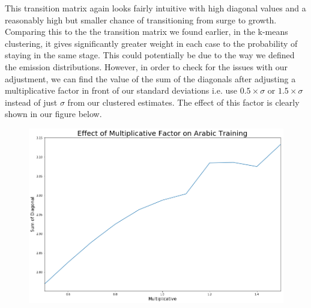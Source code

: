 \documentclass[12pt]{article}
\begin{document}
\vspace{0.5cm}
This transition matrix again looks fairly intuitive with high diagonal values and a reasonably high but smaller chance of transitioning from surge to growth.
Comparing this to the the transition matrix we found earlier, in the k-means clustering, it gives significantly greater weight in each case to the probability of staying in the same stage. This could potentially be due to the way we defined the emission distributions. However, in order to check for the issues with our adjustment, we can find the value of the sum of the diagonals after adjusting a multiplicative factor in front of our standard deviations i.e. use $0.5 \times \sigma$ or $1.5 \times \sigma$ instead of just $\sigma$ from our clustered estimates. The effect of this factor is clearly shown in our figure below. 
\FloatBarrier
\begin{figure}[hbtp]\centering
\includegraphics[width=\textwidth,clip]{MultiplicativeFactor.png}
\end{figure}
\FloatBarrier
\end{document}
